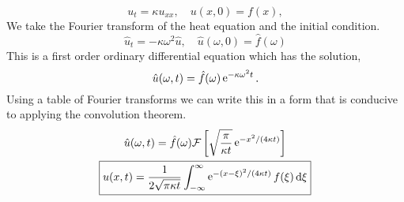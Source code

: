 {%
\begin{Solution}
  \[
  u_{t} = \kappa u_{x x}, \quad u(x,0) = f(x), 
  \]
  We take the Fourier transform of the heat equation and the initial condition.
  \[
  \hat{u}_t = - \kappa \omega^2 \hat{u}, 
  \quad \hat{u}(\omega, 0) = \hat{f}(\omega)
  \]
  This is a first order ordinary differential equation which has the solution,
  \[
  \hat{u}(\omega, t) = \hat{f}(\omega) \mathop{\mathrm{e}}\nolimits^{- \kappa \omega^2 t}.
  \]
  Using a table of Fourier transforms we can write this in a form that is
  conducive to applying the convolution theorem.
  \begin{gather*}
    \hat{u}(\omega, t) = \hat{f}(\omega) \mathcal{F} \left[
      \sqrt{ \frac{\pi}{\kappa t} } \mathop{\mathrm{e}}\nolimits^{-x^2 / (4 \kappa t)} \right] \\
    \boxed{
      u(x, t) = \frac{1}{2 \sqrt{ \pi \kappa t} } \int_{-\infty}^\infty \mathop{\mathrm{e}}\nolimits^{-(x-\xi)^2 / (4 \kappa t)}
      f(\xi)\,\mathrm{d} \xi
      }
  \end{gather*}
\end{Solution}






}
